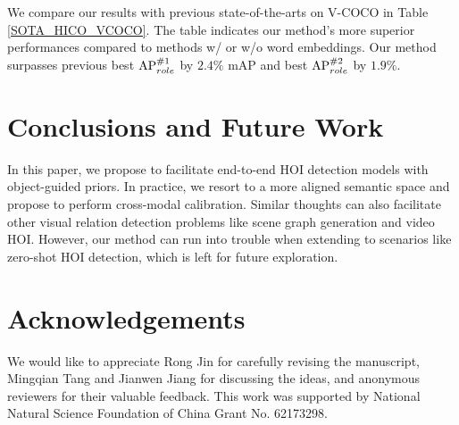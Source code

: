 \documentclass[letterpaper]{article} %
\begin{document}
We compare our results with previous state-of-the-arts on V-COCO in Table \ref{SOTA_HICO_VCOCO}. The table indicates our method's more superior performances compared to methods w/ or w/o word embeddings. Our method surpasses previous best ${\rm AP}_{role}^{\#1}$ by $2.4\%$ mAP and best ${\rm AP}_{role}^{\#2}$ by $1.9\%$. 




\section{Conclusions and Future Work}
In this paper, we propose to facilitate end-to-end HOI detection models with object-guided priors. In practice, we resort to a more aligned semantic space and propose to perform cross-modal calibration. Similar thoughts can also facilitate other visual relation detection problems like scene graph generation and video HOI. However, our method can run into trouble when extending to scenarios like zero-shot HOI detection, which is left for future exploration. 


\section*{Acknowledgements}
We would like to appreciate Rong Jin for carefully revising the manuscript, Mingqian Tang and Jianwen Jiang for discussing the ideas, and anonymous reviewers for their valuable feedback. This work was supported by National Natural Science Foundation of China Grant No. 62173298.



\small
 
\end{document}
